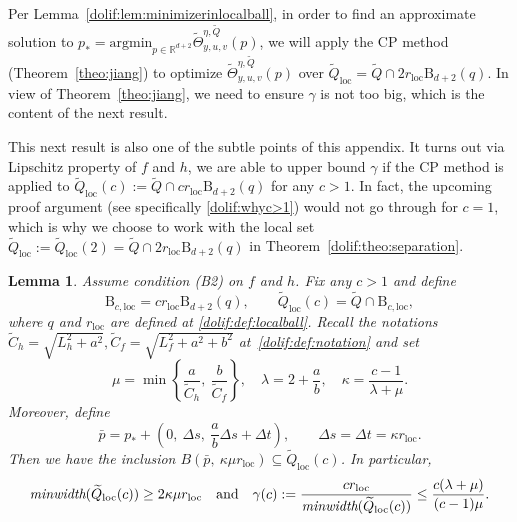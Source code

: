 \documentclass[11pt,letterpaper]{article}
\newcommand{\ball}{\mathrm{B}}
\newcommand{\R}{\mathbb{R}}
\newcommand{\local}{\mathrm{loc}}
\newcommand{\Q}{\widetilde{Q}}
\newcommand{\argmin}{\mathrm{argmin}  }
\newtheorem{lemma}[thm]{Lemma}
\begin{document}
Per Lemma~\ref{dolif:lem:minimizerinlocalball}, in order to find an approximate solution to $ p_*=\argmin_{ p\in \R^{d+2}}\widetilde{\Theta}^{\eta,\Q}_{y,u,v}( p)$, we will apply the CP method (Theorem~\ref{theo:jiang}) to optimize $\widetilde{\Theta}^{\eta,\Q}_{y,u,v}( p)$ over $\Q_{\local}=\Q\cap 2r_{\local}\ball_{d+2}( q)$. In view of Theorem~\ref{theo:jiang}, we need to ensure $\gamma$ is not too big, which is the content of the next result. 

This next result is also one of the subtle points of this appendix. It turns out via Lipschitz property of $f$ and $h$, we are able to  upper bound $\gamma$ if the CP method is applied to $\Q_{\local}(c):=\Q\cap cr_{\local}\ball_{d+2}( q)$ for any $c>1$. In fact, the upcoming proof argument (see specifically \eqref{dolif:whyc>1}) would not go through for $c=1$, which is why we choose to work with the local set $\Q_{\local}:=\Q_{\local}(2)=\Q\cap 2r_\local \ball_{d+2}( q)$ in Theorem~\ref{dolif:theo:separation}. 







\begin{lemma}
\label{dolif:lem:localset}
Assume condition (B2) on $f$ and $h$. Fix any $c>1$ and define
\[
\ball_{c,\local}=c r_\local \ball_{d+2}( q),
\qquad
\Q_{\local}(c)=\Q\cap \ball_{c,\local},
\]
where $ q$ and $r_\local$ are defined at \eqref{dolif:def:localball}. Recall the notations $\widetilde{C}_h=\sqrt{L_h^2+a^2}, \widetilde{C}_f=\sqrt{L_f^2+a^2+b^2}$ at~\eqref{dolif:def:notation} and set
\[
\mu=\min\left\{\frac{a}{\widetilde{C}_h},\ \frac{b}{\widetilde{C}_f}\right\},\quad \lambda=2+\frac{a}{b},\quad \kappa=\frac{c-1}{\lambda+\mu}. 
\]
Moreover, define
\[
\bar p
=
 p_*+\left(0,\ \Delta s,\ \frac{a}{b}\Delta s+\Delta t\right),
\qquad
\Delta s=\Delta t=\kappa r_\local.
\]
Then we have the inclusion $B\left(\bar p,\ \kappa\mu r_\local\right)\subseteq \Q_{\local}(c)$. In particular,
\[
\mbox{\em minwidth}(\Q_{\local}(c))\ge 2\kappa\mu r_\local
\quad\text{and}\quad
\gamma(c):=\frac{c r_\local}{\mbox{\em minwidth}(\Q_{\local}(c))}
\le \frac{c(\lambda+\mu)}{(c-1)\mu}. 
\]
\end{lemma}
\end{document}
